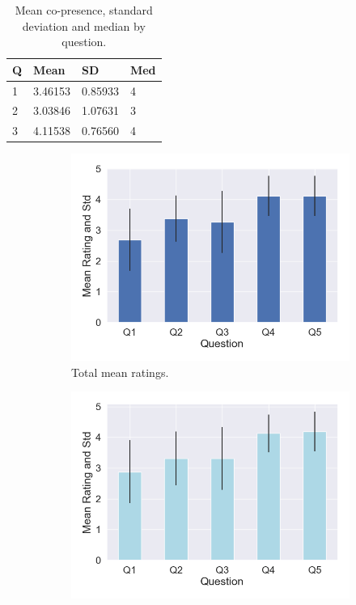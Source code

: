 \begin{table}
\begin{tabular}{|llll|}
\hline
Q & Mean & SD & Med \\
\hline
1 &  3.46153 & 0.85933&4\\  
2 &  3.03846 & 1.07631&3\\ 
3 &  4.11538 & 0.76560&4\\ 
\hline
\end{tabular}
\caption{Mean co-presence, standard deviation and median by question.}
\label{tbl:copres}
\end{table}
\clearpage
\begin{figure}[H]
\hspace{-15mm}
\begin{subfigure}[b]{0.3\textwidth}
 \centering
 \includegraphics[scale=0.33]{Files/Plots/presence_mean_ratings.png}
 \caption{Total mean ratings. }
 \label{fig:presAllMean}
 \end{subfigure}
 \hspace{10mm}
\begin{subfigure}[b]{0.3\textwidth}
 \centering
 \includegraphics[scale=0.33]{Files/Plots/presence_mean_ratings_f.png}

\end{subfigure}
\end{figure}
